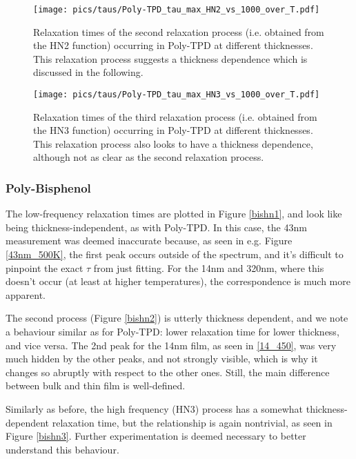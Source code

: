 \begin{figure}[t]%
  \centering
  \texttt{[image: pics/taus/Poly-TPD\_tau\_max\_HN2\_vs\_1000\_over\_T.pdf]}
  \caption{Relaxation times of the second relaxation process (i.e. obtained from the HN2 function) occurring in Poly-TPD at different thicknesses. This relaxation process suggests a thickness dependence which is discussed in the following.}
  \label{tpdhn2}
\end{figure}%

\begin{figure}[t]%
  \centering
  \texttt{[image: pics/taus/Poly-TPD\_tau\_max\_HN3\_vs\_1000\_over\_T.pdf]}
  \caption{Relaxation times of the third relaxation process (i.e. obtained from the HN3 function) occurring in Poly-TPD at different thicknesses. This relaxation process also looks to have a thickness dependence, although not as clear as the second relaxation process. }
  \label{tpdhn3}
\end{figure}%

\subsubsection{Poly-Bisphenol}

The low-frequency relaxation times are plotted in Figure \ref{bishn1}, and look like being thickness-independent, as with Poly-TPD. In this case, the 43nm measurement was deemed inaccurate because, as seen in e.g. Figure \ref{43nm_500K}, the first peak occurs outside of the spectrum, and it's difficult to pinpoint the exact $\tau$ from just fitting.
For the 14nm and 320nm, where this doesn't occur (at least at higher temperatures), the correspondence is much more apparent.

The second process (Figure \ref{bishn2}) is utterly thickness dependent, and we note a behaviour similar as for Poly-TPD: lower relaxation time for lower thickness, and vice versa. The 2nd peak for the 14nm film, as seen in \ref{14_450}, was very much hidden by the other peaks, and not strongly visible, which is why it changes so abruptly with respect to the other ones. Still, the main difference between bulk and thin film is well-defined.

Similarly as before, the high frequency (HN3) process has a somewhat thickness-dependent relaxation time, but the relationship is again nontrivial, as seen in Figure \ref{bishn3}. Further experimentation is deemed necessary to better understand this behaviour.

